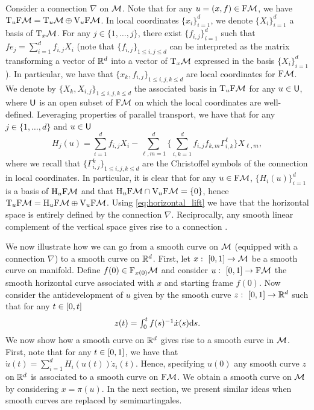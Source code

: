 Consider a connection $\nabla$ on $\mathcal M$. Note that for any $u = (x,f) \in \mathrm{F}\mathcal{M}$, we have
$\mathrm{T}_u \mathrm{F}\mathcal{M} = \mathrm{T}_u \mathcal M \oplus \mathrm{V}_u \mathrm{F}\mathcal{M}$. In local
coordinates $\{x_i\}_{i=1}^d$, we denote $\{X_i\}_{i=1}^d$ a basis of
$\mathrm{T}_x \mathcal M$. For any $j \in \{1, \dots, j\}$, there exist
$\{f_{i,j}\}_{i=1}^d$ such that $f e_j = \sum_{i=1}^d f_{i,j} X_i$ (note that
$\{f_{i,j}\}_{1 \leq i,j \leq d}$ can be interpreted as the matrix transforming
a vector of $\mathbb{R}^d$ into a vector of $\mathrm{T}_x\mathcal M$ expressed in the basis
$\{X_i\}_{i=1}^d$). In particular, we have that
$\{x_k, f_{i,j}\}_{1 \leq i,j, k \leq d}$ are local coordinates for $\mathrm{F}\mathcal{M}$. We
denote by $\{X_k, X_{i,j}\}_{1 \leq i,j,k \leq d}$ the associated basis in
$\mathrm{T}_u \mathrm{F}\mathcal{M}$ for any $u \in \mathsf{U}$, where $\mathsf{U}$ is an open subset of $\mathrm{F}\mathcal{M}$
on which the local coordinates are well-defined. Leveraging properties of
parallel transport, we have that for any $j \in \{1, \dots, d\}$ and $u \in \mathsf{U}$
\begin{equation}
  \label{eq:horizontal_lift}
  \textstyle{ H_j(u) = \sum_{i=1}^d f_{i,j} X_i - \sum_{\ell, m=1}^d \{ \sum_{i, k=1}^d f_{i,j} f_{k,m} \Gamma_{i,k}^\ell\} X_{\ell,m}  ,}
\end{equation}
where we recall that $\{\Gamma_{i,j}^k\}_{1 \leq i,j,k \leq d}$ are the
Christoffel symbols of the connection in local coordinates.  In particular, it
is clear that for any $u \in \mathrm{F}\mathcal{M}$, $\{H_i(u)\}_{i=1}^d$ is a basis of
$\mathrm{H}_u \mathrm{F}\mathcal{M}$ and that $\mathrm{H}_u \mathrm{F}\mathcal{M} \cap \mathrm{V}_u \mathrm{F}\mathcal{M} = \{0\}$,
hence $\mathrm{T}_u \mathrm{F}\mathcal{M} = \mathrm{H}_u \mathrm{F}\mathcal{M} \oplus \mathrm{V}_u \mathrm{F}\mathcal{M}$. Using
\cref{eq:horizontal_lift} we have that the horizontal space is entirely defined
by the connection $\nabla$. Reciprocally, any smooth linear complement of the
vertical space gives rise to a connection \cite[see][Section
11.11]{kolar2013natural}.

We now illustrate how we can go from a smooth curve on $\mathcal M$ (equipped with a
connection $\nabla$) to a smooth curve on $\mathbb{R}^d$. First, let
$x: \ \left[0,1\right] \to \mathcal M$ be a smooth curve on manifold. Define
$f(0) \in \mathrm{F}_{x(0)} \mathcal M$ and consider $u: \ \left[0,1\right] \to \mathrm{F}\mathcal{M}$ the
smooth horizontal curve associated with $x$ and starting frame $f(0)$. Now
consider the antidevelopment of $u$ given by the smooth curve
$z: \ \left[0,1\right] \to \mathbb{R}^d$ such that for any $t \in \left[0,t\right]$
\begin{equation}
  \textstyle{ z(t) = \int_0^t f(s)^{-1} \dot x(s) \mathrm{d}s   . }
\end{equation}
We now show how a smooth curve on $\mathbb{R}^d$ gives rise to a smooth curve in
$\mathcal M$. First, note that for any $t \in \left[0,1\right]$, we have that
$\dot u (t) = \sum_{i=1}^d H_i(u(t)) \dot z_i(t)$. Hence, specifying $u(0)$ any
smooth curve $z$ on $\mathbb{R}^d$ is associated to a smooth curve on $\mathrm{F}\mathcal{M}$. We
obtain a smooth curve on $\mathcal M$ by considering $x = \pi(u)$. In the next section,
we present similar ideas when smooth curves are replaced by semimartingales.

